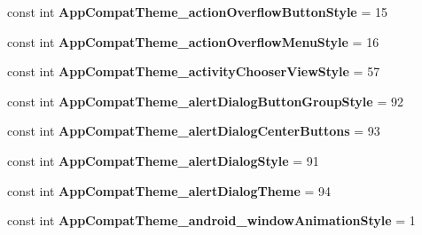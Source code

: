 \begin{DoxyCompactItemize}
const int {\bfseries App\+Compat\+Theme\+\_\+action\+Overflow\+Button\+Style} = 15
\item 
\mbox{\label{class_sample_app_1_1_droid_1_1_resource_1_1_styleable_a151c823003648ae56241dd460448d6d4}} 
const int {\bfseries App\+Compat\+Theme\+\_\+action\+Overflow\+Menu\+Style} = 16
\item 
\mbox{\label{class_sample_app_1_1_droid_1_1_resource_1_1_styleable_acaba8890a31a1941245fe92c6b6ff31d}} 
const int {\bfseries App\+Compat\+Theme\+\_\+activity\+Chooser\+View\+Style} = 57
\item 
\mbox{\label{class_sample_app_1_1_droid_1_1_resource_1_1_styleable_af16da73b47931d2e9e3f38f7fc8893e6}} 
const int {\bfseries App\+Compat\+Theme\+\_\+alert\+Dialog\+Button\+Group\+Style} = 92
\item 
\mbox{\label{class_sample_app_1_1_droid_1_1_resource_1_1_styleable_a366c3816e2fb0d89bd714c9123af2b91}} 
const int {\bfseries App\+Compat\+Theme\+\_\+alert\+Dialog\+Center\+Buttons} = 93
\item 
\mbox{\label{class_sample_app_1_1_droid_1_1_resource_1_1_styleable_ad4a0fc40425b1057475a4707449ecdf1}} 
const int {\bfseries App\+Compat\+Theme\+\_\+alert\+Dialog\+Style} = 91
\item 
\mbox{\label{class_sample_app_1_1_droid_1_1_resource_1_1_styleable_aaa1ea6d0858526821837bf24f680aa8b}} 
const int {\bfseries App\+Compat\+Theme\+\_\+alert\+Dialog\+Theme} = 94
\item 
\mbox{\label{class_sample_app_1_1_droid_1_1_resource_1_1_styleable_a2263b868bca2a55ce2d978dd540b8d6a}} 
const int {\bfseries App\+Compat\+Theme\+\_\+android\+\_\+window\+Animation\+Style} = 1
\item 
\mbox{\label{class_sample_app_1_1_droid_1_1_resource_1_1_styleable_a8665fecd28d0a2ea0e6b946c6e644c42}} 

\end{DoxyCompactItemize}
